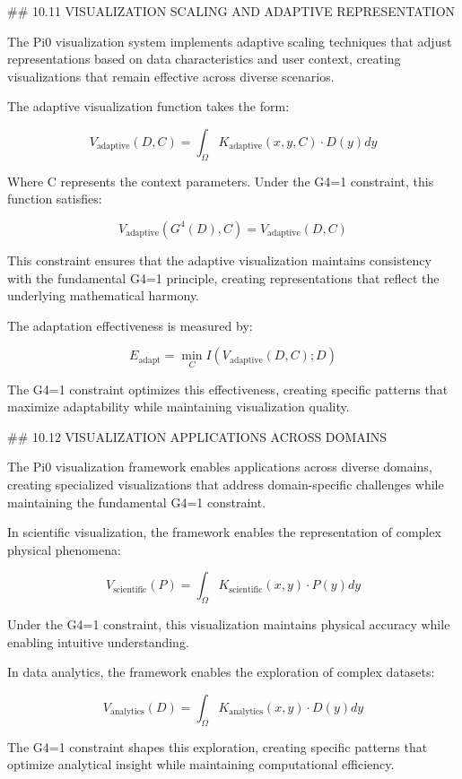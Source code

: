 ## 10.11 VISUALIZATION SCALING AND ADAPTIVE REPRESENTATION

The Pi0 visualization system implements adaptive scaling techniques that adjust representations based on data characteristics and user context, creating visualizations that remain effective across diverse scenarios.

The adaptive visualization function takes the form:

$$V_{\text{adaptive}}(D, C) = \int_{\Omega} K_{\text{adaptive}}(x, y, C) \cdot D(y) dy$$

Where C represents the context parameters. Under the G4=1 constraint, this function satisfies:

$$V_{\text{adaptive}}(G^4(D), C) = V_{\text{adaptive}}(D, C)$$

This constraint ensures that the adaptive visualization maintains consistency with the fundamental G4=1 principle, creating representations that reflect the underlying mathematical harmony.

The adaptation effectiveness is measured by:

$$E_{\text{adapt}} = \min_C I(V_{\text{adaptive}}(D, C); D)$$

The G4=1 constraint optimizes this effectiveness, creating specific patterns that maximize adaptability while maintaining visualization quality.

## 10.12 VISUALIZATION APPLICATIONS ACROSS DOMAINS

The Pi0 visualization framework enables applications across diverse domains, creating specialized visualizations that address domain-specific challenges while maintaining the fundamental G4=1 constraint.

In scientific visualization, the framework enables the representation of complex physical phenomena:

$$V_{\text{scientific}}(P) = \int_{\Omega} K_{\text{scientific}}(x, y) \cdot P(y) dy$$

Under the G4=1 constraint, this visualization maintains physical accuracy while enabling intuitive understanding.

In data analytics, the framework enables the exploration of complex datasets:

$$V_{\text{analytics}}(D) = \int_{\Omega} K_{\text{analytics}}(x, y) \cdot D(y) dy$$

The G4=1 constraint shapes this exploration, creating specific patterns that optimize analytical insight while maintaining computational efficiency.

